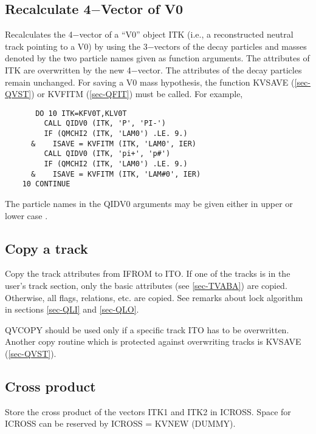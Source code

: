 \subsection{\label{sec-QIDV0}Recalculate 4$-$Vector of V0}
\par
{}
\par
Recalculates the 4$-$vector of a ``V0'' object ITK (i.e., a reconstructed
neutral track pointing to a V0) by using the 3$-$vectors of the decay
particles and masses denoted by the two particle names given as
function arguments. The attributes of ITK are overwritten by the new
4$-$vector. The attributes of the decay particles remain unchanged.
For saving a V0 mass hypothesis, the function KVSAVE
(\ref{sec-QVST})
or KVFITM (\ref{sec-QFIT})
must be called. For example,
\begin{verbatim}
       DO 10 ITK=KFV0T,KLV0T
         CALL QIDV0 (ITK, 'P', 'PI-')
         IF (QMCHI2 (ITK, 'LAM0') .LE. 9.)
      &    ISAVE = KVFITM (ITK, 'LAM0', IER)
         CALL QIDV0 (ITK, 'pi+', 'p#')
         IF (QMCHI2 (ITK, 'LAM0') .LE. 9.)
      &    ISAVE = KVFITM (ITK, 'LAM#0', IER)
    10 CONTINUE
\end{verbatim}
\par
 The particle names in the QIDV0 arguments may be given either in upper or lower case .
 
\par
\subsection{\label{sec-QVC}Copy a track}
\par
{}
\par
Copy the track attributes from IFROM to ITO. If one of the tracks
is in the user's track section, only
the basic attributes (see \ref{sec-TVABA})
are copied. Otherwise, all flags, relations, etc. are copied.
See remarks about lock algorithm in sections
\ref{sec-QLI} and \ref{sec-QLO}.
 
QVCOPY should be used only if a specific track ITO has to be
overwritten. Another copy routine which is protected against
overwriting tracks is KVSAVE
(\ref{sec-QVST}).
\par
\subsection{\label{sec-QVX}Cross product}
\par
{}
\par
\par
Store the cross product of the vectors ITK1 and ITK2 in ICROSS.
Space for ICROSS can be reserved by ICROSS = KVNEW (DUMMY).
 
